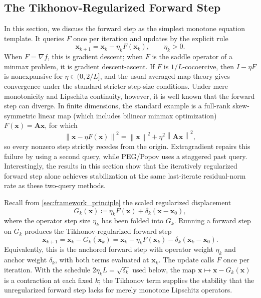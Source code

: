 \documentclass[letterpaper,11pt]{article}
\newcommand{\norm}[1]{\left\| #1 \right\|}
\newcommand{\matr}[1]{\mathbf{#1}}
\newcommand{\vect}[1]{\mathbf{#1}}
\begin{document}

\subsection{The Tikhonov-Regularized Forward Step}
\label{subsec:reg-forward}

In this section, we discuss the forward step as the simplest
monotone equation template. It queries \(F\) once per iteration and updates by
the explicit rule
\[
    \vect{x}_{k+1} = \vect{x}_k - \eta_k F(\vect{x}_k),
    \qquad \eta_k > 0.
\]
When \(F=\nabla f\), this is gradient descent; when \(F\) is the saddle
operator of a minmax problem, it is gradient descent-ascent. If \(F\) is
\(1/L\)-cocoercive, then \(I-\eta F\) is nonexpansive for
\(\eta\in(0,2/L]\), and the usual averaged-map theory gives convergence under
the standard stricter step-size conditions. Under mere monotonicity and
Lipschitz continuity, however, it is well known that the forward step can
diverge. In finite dimensions, the standard example is a full-rank
skew-symmetric linear map (which includes bilinear minmax optimization)
\(F(\vect{x})=\matr{A}\vect{x}\), for which
\[
    \norm{\vect{x}-\eta F(\vect{x})}^2
    =
    \norm{\vect{x}}^2+\eta^2\norm{\matr{A}\vect{x}}^2,
\]
so every nonzero step strictly recedes from the origin. Extragradient repairs
this failure by using a second query, while PEG/Popov uses a staggered past
query. Interestingly, the results in this section show that the iteratively
regularized forward step alone achieves stabilization at the same last-iterate
residual-norm rate as these two-query methods.

Recall from \cref{sec:framework_principle} the scaled regularized displacement
\[
    G_k(\vect{x})
    \coloneqq
    \eta_k F(\vect{x})+\delta_k(\vect{x}-\vect{x}_0),
\]
where the operator step size \(\eta_k\) has been folded into \(G_k\). Running a
forward step on \(G_k\) produces the Tikhonov-regularized forward step
\begin{equation}\label{eq:reg_forward_step}
    \vect{x}_{k+1}
    =
    \vect{x}_k-G_k(\vect{x}_k)
    =
    \vect{x}_k-\eta_kF(\vect{x}_k)-\delta_k(\vect{x}_k-\vect{x}_0).
\end{equation}
Equivalently, this is the anchored forward step with operator weight
\(\eta_k\) and anchor weight \(\delta_k\), with both terms evaluated at
\(\vect{x}_k\). The update calls \(F\) once per iteration. With the schedule
\(2\eta_kL=\sqrt{\delta_k}\) used below, the map
\(\vect{x}\mapsto\vect{x}-G_k(\vect{x})\) is a contraction at each fixed
\(k\); the Tikhonov term supplies the stability that the unregularized forward
step lacks for merely monotone Lipschitz operators.
\end{document}
